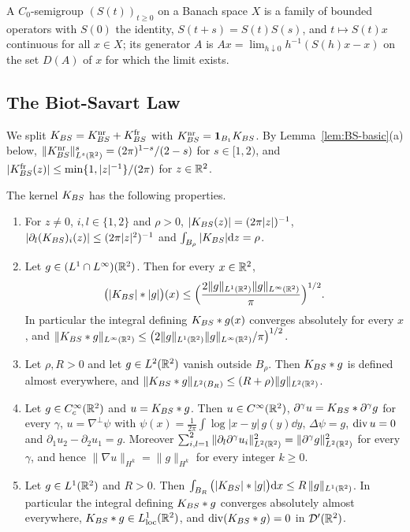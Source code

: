 A $C_0$-semigroup $(S(t))_{t\ge0}$ on a Banach space $X$ is a family of bounded
operators with $S(0)$ the identity, $S(t+s)=S(t)S(s)$, and $t\mapsto S(t)x$ continuous for
all $x\in X$; its generator $A$ is $Ax=\lim_{h\downarrow0}h^{-1}(S(h)x-x)$ on the
set $D(A)$ of $x$ for which the limit exists.

\subsection{The Biot-Savart Law}

We split $K_{BS}=K_{BS}^{\mathrm{nr}}+K_{BS}^{\mathrm{fr}}$ with $K_{BS}^{\mathrm{nr}}=\mathbf 1_{B_1}K_{BS}$. By
Lemma~\ref{lem:BS-basic}(a) below,
$\|K_{BS}^{\mathrm{nr}}\|_{L^s(\mathbb{R}^2)}^s=(2\pi)^{1-s}/(2-s)$ for $s\in[1,2)$, and
$|K_{BS}^{\mathrm{fr}}(z)|\le\min\{1,|z|^{-1}\}/(2\pi)$ for $z\in\mathbb{R}^2$.

\begin{lemma}
\label{lem:BS-basic}
The kernel $K_{BS}$ has the following properties.
\begin{enumerate}[label=\textup{(\alph*)}]
\item For $z\ne0$, $i,l\in\{1,2\}$ and $\rho>0$, $|K_{BS}(z)|=(2\pi|z|)^{-1}$,
  $|\partial_l(K_{BS})_i(z)|\le(2\pi|z|^2)^{-1}$ and
  $\int_{B_\rho}|K_{BS}|\dd z=\rho$.
\item Let $g\in (L^1\cap L^\infty)(\mathbb{R}^2)$. Then for every $x\in\mathbb{R}^2$,
  \[
  \big(|K_{BS}|\ast|g|\big)(x)\le\Big(\frac{2\|g\|_{L^1(\mathbb{R}^2)}\|g\|_{L^\infty(\mathbb{R}^2)}}{\pi}\Big)^{1/2} .
  \]
  In particular the integral defining $K_{BS}\ast g(x)$ converges absolutely for
  every $x$, and
  $\|K_{BS}\ast g\|_{L^\infty(\mathbb{R}^2)}\le\big(2\|g\|_{L^1(\mathbb{R}^2)}\|g\|_{L^\infty(\mathbb{R}^2)}/\pi\big)^{1/2}$.
\item Let $\rho,R>0$ and let $g\in L^2(\mathbb{R}^2)$ vanish outside $B_\rho$. Then
  $K_{BS}\ast g$ is defined almost everywhere, and
  $\|K_{BS}\ast g\|_{L^2(B_R)}\le(R+\rho)\|g\|_{L^2(\mathbb{R}^2)}$.
\item Let $g\in C_c^\infty(\mathbb{R}^2)$ and $u=K_{BS}\ast g$. Then $u\in C^\infty(\mathbb{R}^2)$,
  $\partial^\gamma u=K_{BS}\ast\partial^\gamma g$ for every $\gamma$,
  $u=\nabla^\perp\psi$ with $\psi(x)=\frac1{2\pi}\int\log|x-y|\,g(y)\dd y$,
  $\Delta\psi=g$, $\operatorname{div} u=0$ and $\partial_1u_2-\partial_2u_1=g$. Moreover
  $\sum_{i,l=1}^2\|\partial_l\partial^\gamma u_i\|_{L^2(\mathbb{R}^2)}^2=\|\partial^\gamma g\|_{L^2(\mathbb{R}^2)}^2$
  for every $\gamma$, and hence $\|\nabla u\|_{H^k}=\|g\|_{H^k}$ for every
  integer $k\ge0$.
\item Let $g\in L^1(\mathbb{R}^2)$ and $R>0$. Then
  $\int_{B_R}\big(|K_{BS}|\ast|g|\big)\dd x\le R\,\|g\|_{L^1(\mathbb{R}^2)}$. In particular the
  integral defining $K_{BS}\ast g$ converges absolutely almost everywhere,
  $K_{BS}\ast g\in L^1_{\mathrm{loc}}(\mathbb{R}^2)$, and $\operatorname{div}(K_{BS}\ast g)=0$ in
  $\mathcal D'(\mathbb{R}^2)$.
\end{enumerate}
\end{lemma}


